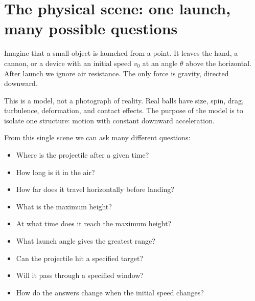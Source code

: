 \documentclass[11pt,a4paper]{article}
\newcommand{\x}{x}
\newcommand{\vect}[1]{\boldsymbol{#1}}
\begin{document}
\newpage

\section{The physical scene: one launch, many possible questions}

Imagine that a small object is launched from a point. It leaves the hand, a cannon, or a device with an initial speed $v_0$ at an angle $\theta$ above the horizontal. After launch we ignore air resistance. The only force is gravity, directed downward.

This is a model, not a photograph of reality. Real balls have size, spin, drag, turbulence, deformation, and contact effects. The purpose of the model is to isolate one structure: motion with constant downward acceleration.

\begin{center}
\end{center}

From this single scene we can ask many different questions:
\begin{itemize}
    \item Where is the projectile after a given time?
    \item How long is it in the air?
    \item How far does it travel horizontally before landing?
    \item What is the maximum height?
    \item At what time does it reach the maximum height?
    \item What launch angle gives the greatest range?
    \item Can the projectile hit a specified target?
    \item Will it pass through a specified window?
    \item How do the answers change when the initial speed changes?
\end{itemize}
\end{document}

